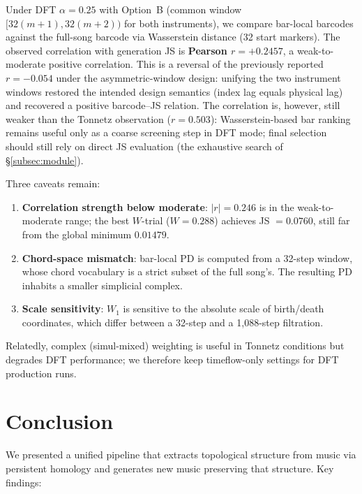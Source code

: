 \documentclass[conference,10pt,a4paper]{IEEEtran}
\begin{document}
Under DFT $\alpha=0.25$ with Option~B (common window $[32(m+1),32(m+2))$
for both instruments), we compare bar-local barcodes against the
full-song barcode via Wasserstein distance (32 start markers).
The observed correlation with generation JS is
\textbf{Pearson $r = +0.2457$}, a weak-to-moderate positive correlation.
This is a reversal of the previously reported $r=-0.054$ under the
asymmetric-window design: unifying the two instrument windows restored
the intended design semantics (index lag equals physical lag) and
recovered a positive barcode--JS relation. The correlation is, however,
still weaker than the Tonnetz observation ($r=0.503$): Wasserstein-based
bar ranking remains useful only as a coarse screening step in DFT mode;
final selection should still rely on direct JS evaluation (the
exhaustive search of \S\ref{subsec:module}).

Three caveats remain:
\begin{enumerate}[nosep]
\item \textbf{Correlation strength below moderate}: $|r|=0.246$ is in the
      weak-to-moderate range; the best $W$-trial ($W=0.288$) achieves
      JS $=0.0760$, still far from the global minimum $0.01479$.
\item \textbf{Chord-space mismatch}: bar-local PD is computed from
      a 32-step window, whose chord vocabulary is a strict subset of
      the full song's.  The resulting PD inhabits a smaller simplicial
      complex.
\item \textbf{Scale sensitivity}: $W_1$ is sensitive to the absolute
      scale of birth/death coordinates, which differ between a 32-step
      and a 1{,}088-step filtration.
\end{enumerate}

Relatedly, complex (simul-mixed) weighting is useful in Tonnetz
conditions but degrades DFT performance; we therefore keep
timeflow-only settings for DFT production runs.

\section{Conclusion}
\label{sec:conclusion}

We presented a unified pipeline that extracts topological structure from
music via persistent homology and generates new music preserving that
structure.  Key findings:
\end{document}
